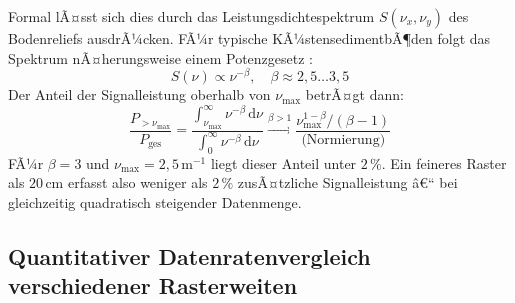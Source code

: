 ﻿\documentclass[a4paper,12pt]{article}
\theoremstyle{definition}
\begin{document}
\medskip\noindent
Formal lÃ¤sst sich dies durch das Leistungsdichtespektrum
$S(\nu_x, \nu_y)$ des Bodenreliefs ausdrÃ¼cken. FÃ¼r typische
KÃ¼stensedimentbÃ¶den folgt das Spektrum nÃ¤herungsweise einem
Potenzgesetz \cite{goff1988, herzfeld1993}:
\begin{equation}
  S(\nu) \propto \nu^{-\beta}, \quad \beta \approx 2{,}5\ldots 3{,}5
  \label{eq:psd}
\end{equation}
Der Anteil der Signalleistung oberhalb von $\nu_{\max}$ betrÃ¤gt
dann:
\begin{equation}
  \frac{P_{>\nu_{\max}}}{P_{\text{ges}}}
  = \frac{\int_{\nu_{\max}}^{\infty} \nu^{-\beta}\,\mathrm{d}\nu}
         {\int_{0}^{\infty} \nu^{-\beta}\,\mathrm{d}\nu}
  \xrightarrow{\beta > 1} \frac{\nu_{\max}^{1-\beta}/(\beta-1)}{\text{(Normierung)}}
  \label{eq:spectralpower}
\end{equation}
FÃ¼r $\beta = 3$ und $\nu_{\max} = 2{,}5\,\text{m}^{-1}$ liegt dieser
Anteil unter $2\,\%$. Ein feineres Raster als $20\,\text{cm}$ erfasst
also weniger als $2\,\%$ zusÃ¤tzliche Signalleistung â€“ bei gleichzeitig
quadratisch steigender Datenmenge.

\subsection{Quantitativer Datenratenvergleich verschiedener Rasterweiten}
\end{document}
